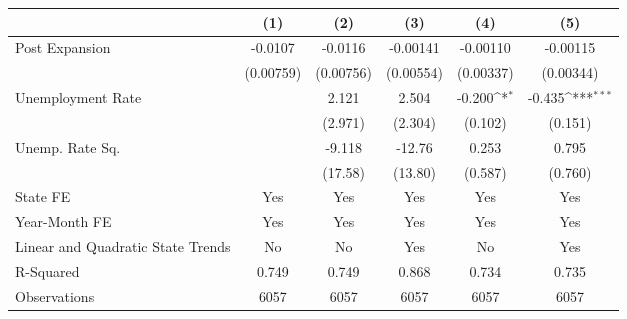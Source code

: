 {
\def\sym#1{\ifmmode^{#1}\else\(^{#1}\)\fi}
\begin{tabular}{l*{5}{c}}
\hline\hline
                    &\multicolumn{1}{c}{(1)}         &\multicolumn{1}{c}{(2)}         &\multicolumn{1}{c}{(3)}         &\multicolumn{1}{c}{(4)}         &\multicolumn{1}{c}{(5)}         \\
\hline
Post Expansion      &     -0.0107         &     -0.0116         &    -0.00141         &    -0.00110         &    -0.00115         \\
                    &   (0.00759)         &   (0.00756)         &   (0.00554)         &   (0.00337)         &   (0.00344)         \\
[1em]
Unemployment Rate   &                     &       2.121         &       2.504         &      -0.200\sym{*}  &      -0.435\sym{***}\\
                    &                     &     (2.971)         &     (2.304)         &     (0.102)         &     (0.151)         \\
[1em]
Unemp. Rate Sq.     &                     &      -9.118         &      -12.76         &       0.253         &       0.795         \\
                    &                     &     (17.58)         &     (13.80)         &     (0.587)         &     (0.760)         \\
\hline
State FE            &         Yes         &         Yes         &         Yes         &         Yes         &         Yes         \\
Year-Month FE       &         Yes         &         Yes         &         Yes         &         Yes         &         Yes         \\
Linear and Quadratic State Trends&          No         &          No         &         Yes         &          No         &         Yes         \\
R-Squared           &       0.749         &       0.749         &       0.868         &       0.734         &       0.735         \\
Observations        &        6057         &        6057         &        6057         &        6057         &        6057         \\
\hline\hline
\end{tabular}
}
